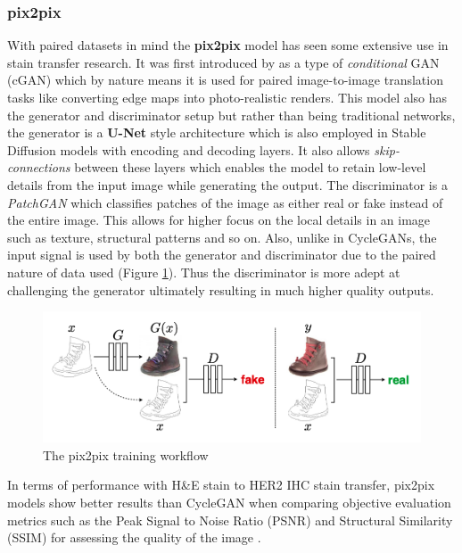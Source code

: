 \subsubsection{pix2pix}

With paired datasets in mind the \textbf{pix2pix} model has seen some extensive use in stain transfer research. It was first introduced by  \textcite{Isola2016Image-to-ImageNetworks} as a type of \textit{conditional} GAN (cGAN) which by nature means it is used for paired image-to-image translation tasks like converting edge maps into photo-realistic renders. This model also has the generator and discriminator setup but rather than being traditional networks, the generator is a \textbf{U-Net} style architecture which is also employed in Stable Diffusion models with encoding and decoding layers. It also allows \textit{skip-connections} between these layers which enables the model to retain low-level details from the input image while generating the output. The discriminator is a \textit{PatchGAN} which classifies patches of the image as either real or fake instead of the entire image. This allows for higher focus on the local details in an image such as texture, structural patterns and so on. Also, unlike in CycleGANs, the input signal is used by both the generator and discriminator due to the paired nature of data used (Figure \ref{fig:pix2pix}). Thus the discriminator is more adept at challenging the generator ultimately resulting in much higher quality outputs.

\begin{figure}[h]
    \centering
    \includegraphics[width=1\linewidth]{2_LiteratureSurvey/figures/pix2pix.png}
    \caption[pix2pix workflow]{The pix2pix training workflow \parencite[Figure 2, p. 2]{Isola2016Image-to-ImageNetworks}}
    \label{fig:pix2pix}
\end{figure}
In terms of performance with H\&E stain to HER2 IHC stain transfer, pix2pix models show better results than CycleGAN when comparing objective evaluation metrics such as the Peak Signal to Noise Ratio (PSNR) and Structural Similarity (SSIM) for assessing the quality of the image \parencite[Table 1, p. 7]{Liu2022BCI:Pix2pix}.

